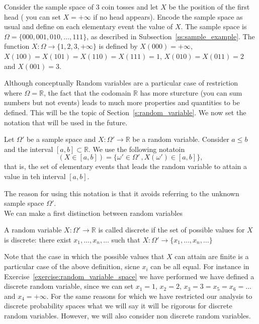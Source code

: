 	\begin{ExerciseList}

		\Exercise \label{exercise:random_variable_space}Consider the sample space of 3 coin tosses and let $X$ be the position of the first head ( you can set $X = + \infty$ if no head appears). Encode the sample space as usual and define on each elementary event the value of $X$. 
		\Answer The sample space is $\Omega = \{000,001,010,\ldots, 111\}$, as described in Subsection~\ref{ss:sample_example}. The function $X: \Omega \to \{1,2,3,+\infty\}$ is defined by $X(000) = + \infty$, $X(100) = X(101) = X(110) = X(111) = 1 $, $X(010) = X(011) = 2 $ and $X(001) = 3$. 
	\end{ExerciseList}
	Although conceptually Random variables are a particular case of restriction where $\Omega = \mathbb R$, the fact that the codomain $\mathbb R$ has more sturcture (you can sum numbers but not events) leads to much more properties and quantities to be defined. This will be the topic of Section~\ref{s:random_variable}. We now set the notation that will be used in the future. 
	\begin{definition}
			\label{d:random_notation}
			Let $\Omega'$ be a sample space and $X:\Omega' \to \mathbb R$ be a random variable. Consider $a \leq b$ and the interval $[a,b] \subset \mathbb R$.  We use the following notatoin 
				\begin{equation}
					\label{e:random_notation}
					( X  \in [a,b]) = \{ \omega' \in \Omega' \,, X(\omega') \in [a,b]\},
				\end{equation}
			that is, the set of elementary events that leads the random variable to attain a value in teh interval $[a,b]$.
	\end{definition}
	The reason for using this notation is that it avoids referring to the unknown sample space $\Omega'$.\\
	We can make a first distinction between random variables
	\begin{definition}
		A random variable $X:\Omega' \to \mathbb R$ is called discrete if the set of possible values for $X$ is discrete: there exist $x_1,\ldots, x_n,\ldots$ such that $X: \Omega' \to\{x_1,\ldots, x_n,\ldots\}$ 
	\end{definition}
	Note that the case in which the possible values that $X$ can attain are finite is a particular case of the above definition, sicne $x_i$ can be all equal. For instance in Exercise~\ref{exercise:random_variable_space} we have performed we have defined a discrete random variable, since we can set $x_1 = 1$, $x_2 = 2$, $x_3 = 3 = x_5 = x_6 = \ldots$ and $x_4 =+ \infty$.
	For the same reasons for which we have restricted our analysis to discrete probability spaces what we will say it will be rigorous for discrete random variables. However, we will also consider non discrete random variables. 




